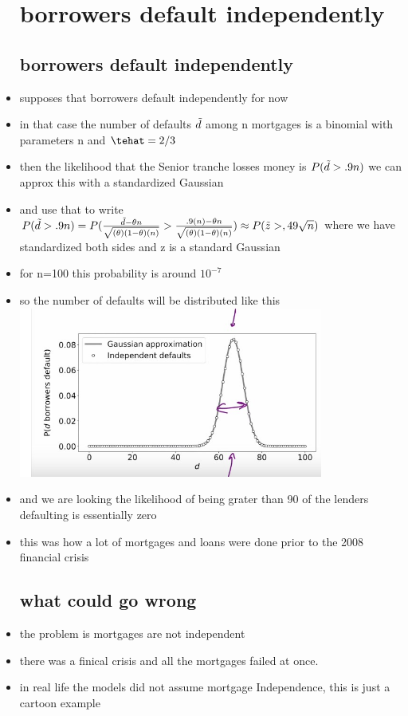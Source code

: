 \documentclass{article}
\begin{document}
\begin{itemize}
\section{borrowers default independently}
\subsection{borrowers default independently}
\item supposes that borrowers default independently for now 
\item in that case the number of defaults $\Tilde{d}$ among n mortgages is a binomial with parameters n and $\tehat=2/3$
\item then the likelihood that the Senior tranche losses money is $P(\Tilde{d}>.9n)$ we can approx this with a standardized Gaussian 
\item and use that to write $P(\Tilde{d}>.9n)=P(\frac{\Tilde{d}-\theta n}{\sqrt{(\theta)(1-\theta)(n)}}>\frac{.9(n)-\theta n}{\sqrt{(\theta)(1-\theta)(n)}})\approx P(\Tilde{z}>,49\sqrt{n})$ where we have standardized both sides and z is a standard Gaussian  
\item for n=100 this probability is around $10^{-7}$
\item so the number of defaults will be distributed like this \\ \includegraphics[width=10cm]{notes/week_4/vidio 3:How Not To Estimate Ris/immages/v_3_1.jpg}
\item and we are looking the likelihood of being grater than 90 of the lenders defaulting is essentially zero
\item this was how a lot of mortgages and loans were done prior to the 2008 financial crisis
\subsection{what could go wrong}
\item the problem is mortgages are not independent 
\item there was a finical crisis and all the mortgages failed at once. 
\item in real life the models did not assume mortgage Independence, this is just a cartoon example

\end{itemize}
\end{document}
